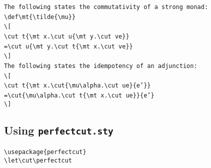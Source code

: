 \documentclass[12pt,a4paper,british]{scrartcl}
\begin{document}
\noindent \texttt{\footnotesize{The following states the commutativity
of a strong monad:}}~\\
\texttt{\footnotesize{\textbackslash{}def\textbackslash{}mt\{\textbackslash{}tilde\{\textbackslash{}mu\}\}}}~\\
\texttt{\footnotesize{\textbackslash{}{[}}}~\\
\texttt{\footnotesize{\textbackslash{}cut t\{\textbackslash{}mt x.\textbackslash{}cut
u\{\textbackslash{}mt y.\textbackslash{}cut ve\}\}}}~\\
\texttt{\footnotesize{=\textbackslash{}cut u\{\textbackslash{}mt y.\textbackslash{}cut
t\{\textbackslash{}mt x.\textbackslash{}cut ve\}\}}}~\\
\texttt{\footnotesize{\textbackslash{}{]}}}~\\
\texttt{\footnotesize{The following states the idempotency of an adjunction: }}~\\
\texttt{\footnotesize{\textbackslash{}{[}}}~\\
\texttt{\footnotesize{\textbackslash{}cut t\{\textbackslash{}mt x.\textbackslash{}cut\{\textbackslash{}mu\textbackslash{}alpha.\textbackslash{}cut
ue\}\{e'\}\}}}~\\
\texttt{\footnotesize{=\textbackslash{}cut\{\textbackslash{}mu\textbackslash{}alpha.\textbackslash{}cut
t\{\textbackslash{}mt x.\textbackslash{}cut ue\}\}\{e'\}}}~\\
\texttt{\footnotesize{\textbackslash{}{]}}}{\footnotesize \par}


\subsection{Using \texttt{perfectcut.sty}}

\noindent \texttt{\footnotesize{\textbackslash{}usepackage\{perfectcut\}}}~\\
\texttt{\footnotesize{\textbackslash{}let\textbackslash{}cut\textbackslash{}perfectcut}}{\footnotesize \par}

\begin{center}
\end{center}
\end{document}
